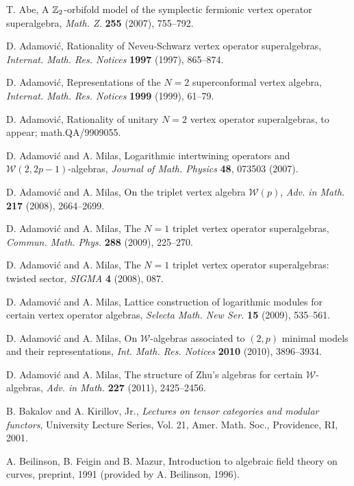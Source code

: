 \documentclass[12pt]{article}
\begin{document}
\begin{thebibliography}{FGST2}

T. Abe,
A $\mathbb{Z}\sb 2$-orbifold model of the symplectic fermionic vertex
operator superalgebra, {\em Math. Z.} {\bf 255} (2007), 755--792.

D. Adamovi\'c,
Rationality of Neveu-Schwarz vertex operator superalgebras,
{\em Internat. Math. Res. Notices} {\bf 1997} (1997), 865--874.

D. Adamovi\'c,
Representations of the $N=2$ superconformal vertex algebra,
{\em Internat. Math. Res. Notices} {\bf 1999} (1999), 61--79.

D. Adamovi\'c,
Rationality of unitary $N=2$ vertex operator superalgebras, to appear;
math.QA/9909055.

 D. Adamovi\'c and A. Milas, Logarithmic 
intertwining operators
and $\mathcal{W}(2,2p-1)$-algebras, {\em Journal of Math. Physics}
{\bf 48}, 073503 (2007).

 D. Adamovi\'c and A. Milas, 
On the triplet vertex algebra $\mathcal{W}(p)$, {\it Adv. in Math.}
{\bf 217} (2008), 2664--2699.

D. Adamovi\'c and A. Milas, 
The $N=1$ triplet vertex operator superalgebras,  {\it Commun. Math. Phys.}
{\bf 288} (2009), 225--270.

D. Adamovi\'c and A. Milas, The $N = 1$ triplet vertex operator superalgebras: 
twisted sector, {\it SIGMA} {\bf 4} (2008), 087.

D. Adamovi\'{c} and A. Milas, Lattice construction of logarithmic
modules for certain vertex operator algebras, {\it Selecta Math. New Ser.}
{\bf  15} (2009), 535--561.


D. Adamovi\'{c} and A. Milas, On $\mathcal{W}$-algebras associated to
$(2,p)$ minimal models and their representations, {\it
Int. Math. Res. Notices} {\bf 2010} (2010), 3896--3934.

D. Adamovi\'{c} and A. Milas, 
The structure of Zhu's algebras for certain $\mathcal{W}$-algebras,
{\it Adv. in Math.} {\bf 227} (2011), 2425--2456.

B. Bakalov and A. Kirillov, Jr., {\em Lectures
on tensor categories and modular functors},
University Lecture Series, Vol. 21,
Amer. Math. Soc., Providence, RI, 2001.

A. Beilinson, B. Feigin and B. Mazur, Introduction to algebraic field
theory on curves, preprint, 1991 (provided by A. Beilinson, 1996).


\end{thebibliography}
\end{document}

